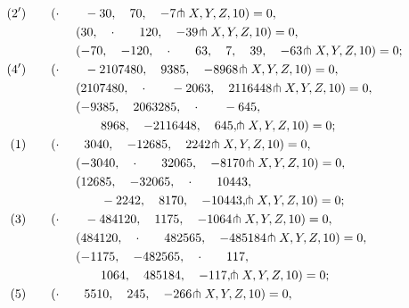 \documentclass[11pt,a4paper]{article}
\begin{document}
\begin{align*}
(2')\qquad &(\cdot\qquad -30,\quad 70,\quad -7\hspace{-0.2em}\pitchfork X, Y, Z, 10) = 0,\\
&\qquad(30,\quad \cdot\qquad 120,\quad -39\hspace{-0.2em}\pitchfork X, Y, Z, 10) = 0,\\
&\qquad(-70,\quad -120,\quad \cdot\qquad 63,\quad 7,\quad 39,\quad -63\hspace{-0.2em}\pitchfork X, Y, Z, 10) = 0;\\
(4')\qquad &(\cdot\qquad -2107480,\quad 9385,\quad -8968\hspace{-0.2em}\pitchfork X, Y, Z, 10) = 0,\\
&\qquad(2107480,\quad \cdot\qquad -2063,\quad 2116448\hspace{-0.2em}\pitchfork X, Y, Z, 10) = 0,\\
&\qquad(-9385,\quad 2063285,\quad \cdot\qquad -645,\\
&\qquad\qquad 8968,\quad -2116448,\quad 645,\hspace{-0.2em}\pitchfork X, Y, Z, 10) = 0;\\
(1)\qquad &(\cdot\qquad 3040,\quad -12685,\quad 2242\hspace{-0.2em}\pitchfork X, Y, Z, 10) = 0,\\
&\qquad(-3040,\quad \cdot\qquad 32065,\quad -8170\hspace{-0.2em}\pitchfork X, Y, Z, 10) = 0,\\
&\qquad(12685,\quad -32065,\quad \cdot\qquad 10443,\\
&\qquad\qquad -2242,\quad 8170,\quad -10443,\hspace{-0.2em}\pitchfork X, Y, Z, 10) = 0;\\
(3)\qquad &(\cdot\qquad -484120,\quad 1175,\quad -1064\hspace{-0.2em}\pitchfork X, Y, Z, 10) = 0,\\
&\qquad(484120,\quad \cdot\qquad 482565,\quad -485184\hspace{-0.2em}\pitchfork X, Y, Z, 10) = 0,\\
&\qquad(-1175,\quad -482565,\quad \cdot\qquad 117,\\
&\qquad\qquad 1064,\quad 485184,\quad -117,\hspace{-0.2em}\pitchfork X, Y, Z, 10) = 0;\\
(5)\qquad &(\cdot\qquad 5510,\quad 245,\quad -266\hspace{-0.2em}\pitchfork X, Y, Z, 10) = 0,\\

\end{align*}
\end{document}
